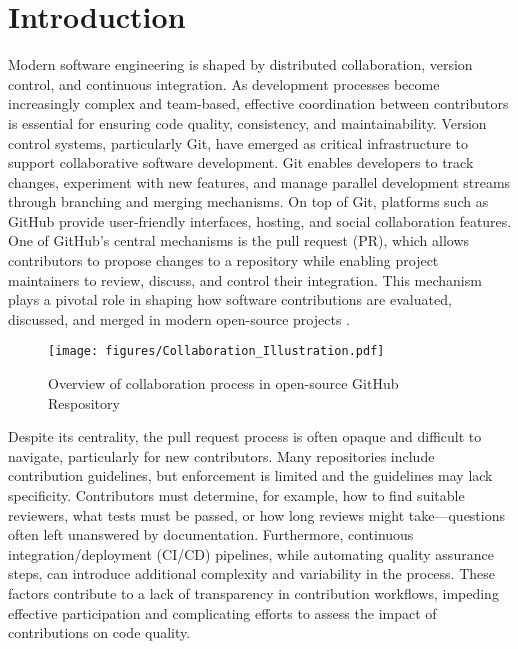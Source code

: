 \chapter{Introduction}
\label{chap:intro}

Modern software engineering is shaped by distributed collaboration, version control, and continuous integration. As development processes become increasingly complex and team-based, effective coordination between contributors is essential for ensuring code quality, consistency, and maintainability. Version control systems, particularly Git, have emerged as critical infrastructure to support collaborative software development. Git enables developers to track changes, experiment with new features, and manage parallel development streams through branching and merging mechanisms. On top of Git, platforms such as GitHub provide user-friendly interfaces, hosting, and social collaboration features. One of GitHub’s central mechanisms is the pull request (PR), which allows contributors to propose changes to a repository while enabling project maintainers to review, discuss, and control their integration. This mechanism plays a pivotal role in shaping how software contributions are evaluated, discussed, and merged in modern open-source projects \autocite{DBLP:conf/icse/TsayDH14}.

\begin{figure}[htbp]
    \centering
    \texttt{[image: figures/Collaboration\_Illustration.pdf]}
    \caption{Overview of collaboration process in open-source GitHub Respository}
    \label{fig:your-label}
\end{figure}

Despite its centrality, the pull request process is often opaque and difficult to navigate, particularly for new contributors. Many repositories include contribution guidelines, but enforcement is limited and the guidelines may lack specificity. Contributors must determine, for example, how to find suitable reviewers, what tests must be passed, or how long reviews might take—questions often left unanswered by documentation. Furthermore, continuous integration/deployment (CI/CD) pipelines, while automating quality assurance steps, can introduce additional complexity and variability in the process. These factors contribute to a lack of transparency in contribution workflows, impeding effective participation and complicating efforts to assess the impact of contributions on code quality.

